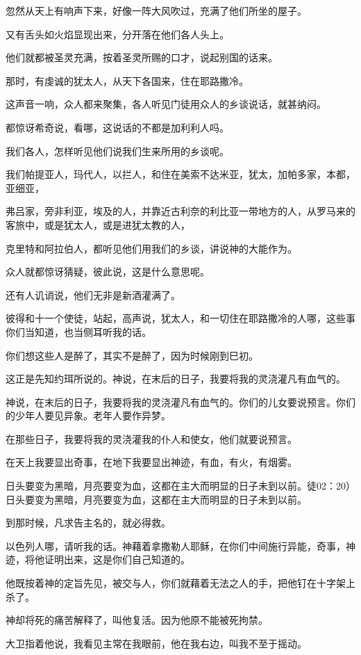 \documentclass[12pt,oneside]{book}
\begin{document}
忽然从天上有响声下来，好像一阵大风吹过，充满了他们所坐的屋子。

又有舌头如火焰显现出来，分开落在他们各人头上。

他们就都被圣灵充满，按着圣灵所赐的口才，说起别国的话来。

那时，有虔诚的犹太人，从天下各国来，住在耶路撒冷。

这声音一响，众人都来聚集，各人听见门徒用众人的乡谈说话，就甚纳闷。

都惊讶希奇说，看哪，这说话的不都是加利利人吗。

我们各人，怎样听见他们说我们生来所用的乡谈呢。

我们帕提亚人，玛代人，以拦人，和住在美索不达米亚，犹太，加帕多家，本都，亚细亚，

弗吕家，旁非利亚，埃及的人，并靠近古利奈的利比亚一带地方的人，从罗马来的客旅中，或是犹太人，或是进犹太教的人，

克里特和阿拉伯人，都听见他们用我们的乡谈，讲说神的大能作为。

众人就都惊讶猜疑，彼此说，这是什么意思呢。

还有人讥诮说，他们无非是新酒灌满了。

彼得和十一个使徒，站起，高声说，犹太人，和一切住在耶路撒冷的人哪，这些事你们当知道，也当侧耳听我的话。

你们想这些人是醉了，其实不是醉了，因为时候刚到巳初。

这正是先知约珥所说的。神说，在末后的日子，我要将我的灵浇灌凡有血气的。

神说，在末后的日子，我要将我的灵浇灌凡有血气的。你们的儿女要说预言。你们的少年人要见异象。老年人要作异梦。

在那些日子，我要将我的灵浇灌我的仆人和使女，他们就要说预言。

在天上我要显出奇事，在地下我要显出神迹，有血，有火，有烟雾。

日头要变为黑暗，月亮要变为血，这都在主大而明显的日子未到以前。徒02：20）日头要变为黑暗，月亮要变为血，这都在主大而明显的日子未到以前。

到那时候，凡求告主名的，就必得救。

以色列人哪，请听我的话。神藉着拿撒勒人耶稣，在你们中间施行异能，奇事，神迹，将他证明出来，这是你们自己知道的。

他既按着神的定旨先见，被交与人，你们就藉着无法之人的手，把他钉在十字架上杀了。

神却将死的痛苦解释了，叫他复活。因为他原不能被死拘禁。

大卫指着他说，我看见主常在我眼前，他在我右边，叫我不至于摇动。
\end{document}
